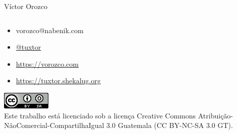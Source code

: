 \documentclass[aspectratio=169]{beamer}
\begin{document}
\begin{frame}{Víctor Orozco}
\begin{columns}[T]
\begin{column}[T]{6cm}
				\begin{itemize}
					\item vorozco@nabenik.com
					\item \href{https://twitter.com/tuxtor}{@tuxtor}
					\item \href{https://vorozco.com}{https://vorozco.com}
					\item \href{https://tuxtor.shekalug.org}{https://tuxtor.shekalug.org}
				\end{itemize}
				\begin{center}
					\includegraphics[width=0.1\linewidth]{Images/cclogo}
					\\
					Este trabalho está licenciado sob a licença Creative Commons Atribuição-NãoComercial-CompartilhaIgual 3.0 Guatemala (CC BY-NC-SA 3.0 GT).
				\end{center}
			\end{column}
		\end{columns}
	\end{frame}

	
\end{document}
